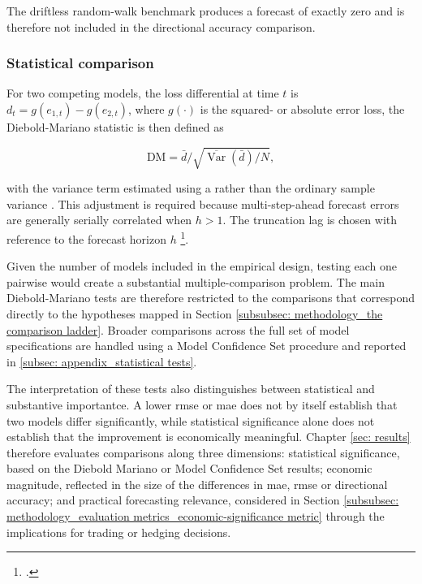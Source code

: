 The driftless random-walk benchmark produces a forecast of exactly zero and is therefore not included in the directional accuracy comparison.

\subsubsection{Statistical comparison}
For two competing models, the loss differential at time $t$ is $d_t=g(e_{1,t})-g(e_{2,t})$, where $g(\cdot)$ is the squared- or absolute error loss, the Diebold-Mariano statistic is then defined as 

\begin{equation}
\mathrm{DM}=\bar{d} / \sqrt{\overline{\operatorname{Var}}(\bar{d}) / N},
\end{equation}

\noindent with the variance term estimated using a  rather than the ordinary sample variance \parencite{dieboldComparingPredictiveAccuracy1995}. This adjustment is required because multi-step-ahead forecast errors are generally serially correlated when $h>1$. The truncation lag is chosen with reference to the forecast horizon $h$ \footnote{ \textcite{dieboldComparingPredictiveAccuracy1995}.}.

Given the number of models included in the empirical design, testing each one pairwise would create a substantial multiple-comparison problem. The main Diebold-Mariano tests are therefore restricted to the comparisons that correspond directly to the hypotheses mapped in Section \ref{subsubsec: methodology_the comparison ladder}. Broader comparisons across the full set of model specifications are handled using a Model Confidence Set procedure and reported in  \ref{subsec: appendix_statistical tests}.

The interpretation of these tests also distinguishes between statistical and substantive importantce. A lower \ac{rmse} or \ac{mae} does not by itself establish that two models differ significantly, while statistical significance alone does not establish that the improvement is economically meaningful. Chapter \ref{sec: results} therefore evaluates comparisons along three dimensions: statistical significance, based on the Diebold Mariano or Model Confidence Set results; economic magnitude, reflected in the size of the differences in \ac{mae}, \ac{rmse} or directional accuracy; and practical forecasting relevance, considered in Section \ref{subsubsec: methodology_evaluation metrics_economic-significance metric} through the implications for trading or hedging decisions.



